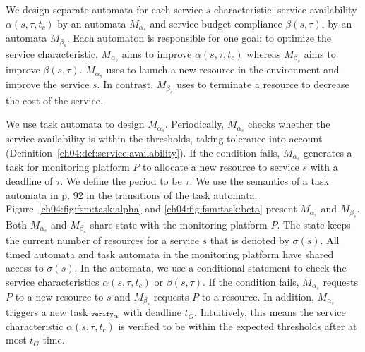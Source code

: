 We design separate automata for each service $s$ characteristic: service availability $\alpha(s,\tau,t_c)$ by an automata $M_{\alpha_s}$ and service budget compliance $\beta(s,\tau)$, by an automata $M_{\beta_s}$.
Each automaton is responsible for one goal: to optimize the service characteristic.
$M_{\alpha_s}$ aims to improve $\alpha(s,\tau,t_c)$ whereas $M_{\beta_s}$ aims to improve $\beta(s,\tau)$.
$M_{\alpha_s}$ uses  to launch a new resource in the environment and improve the service $s$.
In contrast, $M_{\beta_s}$ uses  to terminate a resource to decrease the cost of the service.

We use task automata to design $M_{\alpha_s}$.
Periodically, $M_{\alpha_s}$ checks whether the service availability
is within the thresholds, taking tolerance into account
(Definition~\ref{ch04:def:service:availability}).
If the condition fails, $M_{\alpha_s}$ generates a task for monitoring platform $P$ to allocate a new resource to service $s$ with a deadline of $\tau$.
We define the period to be $\tau$.
We use the semantics of a task automata in \cite{jaghoori2010time} p. 92 in the transitions of the task automata.
Figure~\ref{ch04:fig:fsm:task:alpha} and \ref{ch04:fig:fsm:task:beta} present $M_{\alpha_s}$ and $M_{\beta_s}$.
Both $M_{\alpha_s}$ and $M_{\beta_s}$ share state with the monitoring platform $P$.
The state keeps the current number of resources for a service $s$ that is denoted by $\sigma(s)$.
All timed automata and task automata in the monitoring platform have shared access to $\sigma(s)$.
In the automata, we use a conditional statement to check the service characteristics $\alpha(s,\tau,t_c)$ or $\beta(s,\tau)$.
If the condition fails, $M_{\alpha_s}$ requests $P$ to  a new resource to $s$ and $M_{\beta_s}$ requests $P$ to  a resource.
In addition, $M_{\alpha_s}$ triggers a new task ${\scriptsize\texttt{verify}}_\alpha$ with deadline $t_G$.
Intuitively, this means the service characteristic $\alpha(s,\tau,t_c)$ is verified to be within the expected thresholds after at most $t_G$ time.


